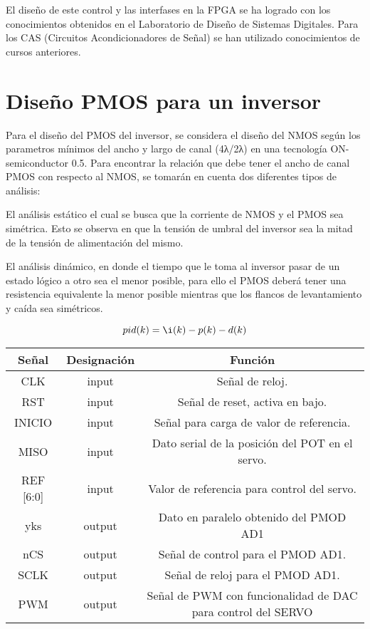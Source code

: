 \documentclass[12pt,a4paper]{article} %
\begin{document}
El diseño de este control y las interfases en la FPGA se ha logrado con los conocimientos obtenidos en el Laboratorio de Diseño de Sistemas Digitales. Para los CAS (Circuitos Acondicionadores de Señal) se han utilizado conocimientos de cursos anteriores.


\section{Diseño PMOS para un inversor}

Para el diseño del PMOS del inversor, se considera el diseño del NMOS según los parametros mínimos del ancho y largo de canal (4λ/2λ) en una tecnología ON-semiconductor 0.5. Para encontrar la relación que debe tener el ancho de canal PMOS con respecto al NMOS, se tomarán en cuenta dos diferentes tipos de análisis:

El análisis estático el cual se busca que la corriente de NMOS y el PMOS sea simétrica. Esto se observa en que la tensión de umbral del inversor sea la mitad de la tensión de alimentación del mismo.

El análisis dinámico, en donde el tiempo que le toma al inversor pasar de un estado lógico a otro sea el menor posible, para ello el PMOS deberá tener una resistencia equivalente la menor posible mientras que los flancos de levantamiento y caída sea simétricos.

\begin{equation}\label{eqn:eqIPD}
pid(k)=\i(k)-p(k)-d(k)
\end{equation}

\begin{tabular}{c||c||c}
Señal & Designación & Función\\
\hline
\hline
CLK & input & Señal de reloj. \\
RST & input & Señal de reset, activa en bajo. \\
INICIO & input & Señal para carga de valor de referencia.\\
MISO & input & Dato serial de la posición del POT en el servo.\\
REF [6:0] & input & Valor de referencia para control del servo.\\
\hline
yks & output & Dato en paralelo obtenido del PMOD AD1\\
nCS & output & Señal de control para el PMOD AD1. \\
SCLK & output & Señal de reloj para el PMOD AD1. \\
PWM & output & Señal de PWM con funcionalidad de DAC para control del SERVO \\
\end{tabular}
\end{document}
